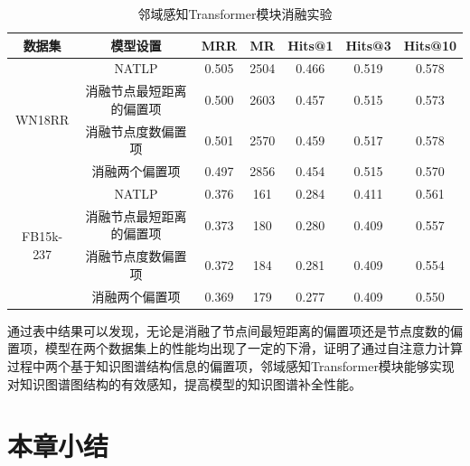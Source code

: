 \begin{table}[htbp]
  \begin{center}
      \caption{邻域感知Transformer模块消融实验}
      \setlength{\tabcolsep}{8pt}
      \renewcommand\arraystretch{1.5}
      \begin{tabular}{*{7}{c}}
          \toprule
          数据集 & 模型设置 & MRR&MR&Hits@1&Hits@3&	Hits@10\\
          \midrule
          \multirow{4}{*}{WN18RR}&NATLP&0.505&2504&0.466&0.519&0.578\\
          &消融节点最短距离的偏置项&0.500&2603&0.457&0.515&0.573\\
          &消融节点度数偏置项&0.501&2570&0.459&0.517&0.578\\
          &消融两个偏置项&0.497&2856&0.454&0.515&0.570\\
          \cmidrule{1-7}
          \multirow{4}{*}{FB15k-237}&NATLP&0.376&161&0.284&0.411&0.561\\
          &消融节点最短距离的偏置项&0.373&180&0.280&0.409&0.557\\
          &消融节点度数偏置项&0.372&184&0.281&0.409&0.554\\
          &消融两个偏置项&0.369&179&0.277&0.409&0.550\\
          \bottomrule
      \end{tabular}
      \label{NATLP_ablation2}
  \end{center}
\end{table}

通过表中结果可以发现，无论是消融了节点间最短距离的偏置项还是节点度数的偏置项，模型在两个数据集上的性能均出现了一定的下滑，证明了通过自注意力计算过程中两个基于知识图谱结构信息的偏置项，邻域感知Transformer模块能够实现对知识图谱图结构的有效感知，提高模型的知识图谱补全性能。


\section{本章小结}


